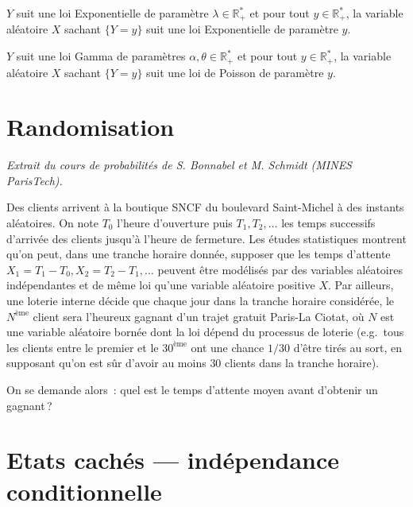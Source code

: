 \label{III-loiconj-expexp}
\(Y\) suit une loi Exponentielle de paramètre
\(\lambda \in\mathbb{R}_+^\ast\) et pour tout \(y\in\mathbb{R}_+^\ast\),
la variable aléatoire \(X\) sachant \(\{Y=y\}\) suit une loi
Exponentielle de paramètre \(y\).

\label{III-loiconj-gampoi}
\(Y\) suit une loi Gamma de paramètres
\(\alpha,\theta \in \mathbb{R}_+^\ast\) et pour tout
\(y\in\mathbb{R}_+^\ast\), la variable aléatoire \(X\) sachant
\(\{Y=y\}\) suit une loi de Poisson de paramètre
\(y\).

\section{Randomisation}\label{III-randomize}

\emph{Extrait du cours de probabilités de S. Bonnabel et M. Schmidt
(MINES ParisTech).}

Des clients arrivent à la boutique SNCF du boulevard Saint-Michel à des
instants aléatoires. On note \(T_0\) l'heure d'ouverture puis
\(T_1, T_2, \dots\) les temps successifs d'arrivée des clients jusqu'à
l'heure de fermeture. Les études statistiques montrent qu'on peut, dans
une tranche horaire donnée, supposer que les temps d'attente
\(X_1 = T_1 -T_0, X_2 = T_2 -T_1,\dots\) peuvent être modélisés par des
variables aléatoires indépendantes et de même loi qu'une variable
aléatoire positive \(X\). Par ailleurs, une loterie interne décide que
chaque jour dans la tranche horaire considérée, le \(N^{\text{ème}}\)
client sera l'heureux gagnant d'un trajet gratuit Paris-La Ciotat, où
\(N\) est une variable aléatoire bornée dont la loi dépend du processus
de loterie (e.g.~tous les clients entre le premier et le
\(30^{\text{ème}}\) ont une chance \(1/30\) d'être tirés au sort, en
supposant qu'on est sûr d'avoir au moins \(30\) clients dans la tranche
horaire).

On se demande alors~: quel est le temps d'attente moyen avant d'obtenir
un gagnant\,?

\section{Etats cachés --- indépendance
conditionnelle}\label{III-etats-cachuxe9s-induxe9pendance-conditionnelle}

